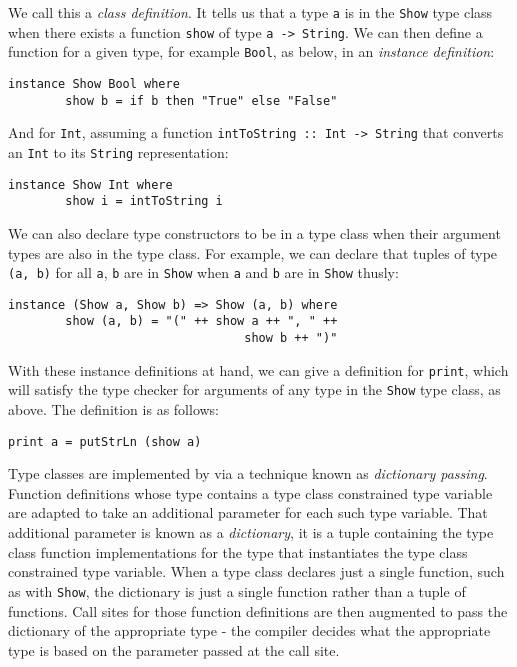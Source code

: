 \noindent We call this a \emph{class definition}. It tells us that a type
\texttt{a} is in the \texttt{Show} type class when there exists a function
\texttt{show} of type \texttt{a -> String}. We can then define a function for a
given type, for example \texttt{Bool}, as below, in an \emph{instance
definition}:
\begin{lstlisting}[mathescape]
    instance Show Bool where
        show b = if b then "True" else "False"
\end{lstlisting}

\noindent And for \texttt{Int}, assuming a function \texttt{intToString :: Int
-> String} that converts an \texttt{Int} to its \texttt{String} representation:
\begin{lstlisting}[mathescape]
    instance Show Int where
        show i = intToString i
\end{lstlisting}

\noindent We can also declare type constructors to be in a type class when their
argument types are also in the type class. For example, we can declare that
tuples of type \texttt{(a, b)} for all \texttt{a}, \texttt{b} are in
\texttt{Show} when \texttt{a} and \texttt{b} are in \texttt{Show} thusly:
\begin{lstlisting}[mathescape]
    instance (Show a, Show b) => Show (a, b) where
        show (a, b) = "(" ++ show a ++ ", " ++
                                 show b ++ ")"
\end{lstlisting}

\noindent With these instance definitions at hand, we can give a definition for
\texttt{print}, which will satisfy the type checker for arguments of any type in
the \texttt{Show} type class, as above. The definition is as follows:
\begin{lstlisting}[mathescape]
    print a = putStrLn (show a)
\end{lstlisting}

Type classes are implemented by via a technique known as \emph{dictionary
passing}. Function definitions whose type contains a type class constrained type
variable are adapted to take an additional parameter for each such type
variable. That additional parameter is known as a \emph{dictionary}, it is a
tuple containing the type class function implementations for the type that
instantiates the type class constrained type variable. When a type class
declares just a single function, such as with \texttt{Show}, the dictionary is
just a single function rather than a tuple of functions. Call sites for those
function definitions are then augmented to pass the dictionary of the
appropriate type - the compiler decides what the appropriate type is based on
the parameter passed at the call site.

